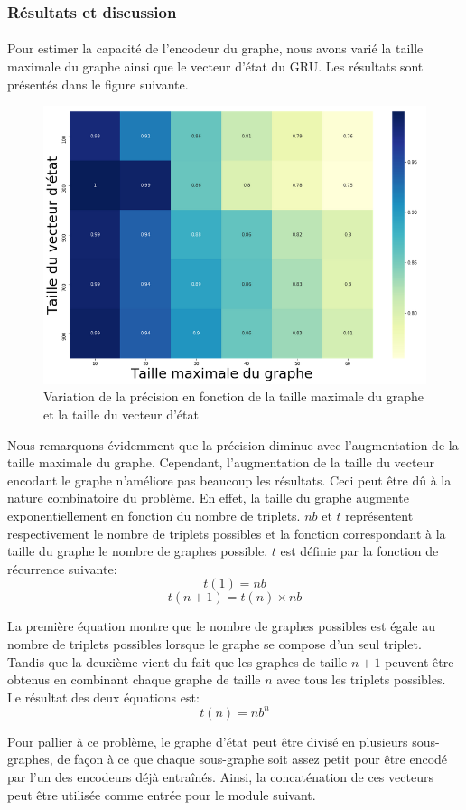 \subsubsection{Résultats et discussion}
\paragraph{}Pour estimer la capacité de l'encodeur du graphe, nous avons varié la taille maximale du graphe ainsi que le vecteur d'état du GRU. Les résultats sont présentés dans le figure suivante.
\begin{figure}[H] 
	\centering
	\includegraphics[width=0.95\linewidth]{images/Realisation/DM/heatmap.png}
	\caption{Variation de la précision en fonction de la taille maximale du graphe et la taille du vecteur d'état}\label{heatmap}
\end{figure}
\par Nous remarquons évidemment que la précision diminue avec l'augmentation de la taille maximale du graphe. Cependant, l'augmentation de la taille du vecteur encodant le graphe n'améliore pas beaucoup les résultats. Ceci peut être dû à la nature combinatoire du problème. En effet, la taille du graphe augmente exponentiellement en fonction du nombre de triplets. $nb$ et $t$ représentent respectivement le nombre de triplets possibles et la fonction correspondant à la taille du graphe le nombre de graphes possible. $t$ est définie par la fonction de récurrence suivante:
\[t(1) = nb\]
\[t(n+1) = t(n) \times nb\]
\par La première équation montre que le nombre de graphes possibles est égale au nombre de triplets possibles lorsque le graphe se compose d'un seul triplet. Tandis que la deuxième vient du fait que les graphes de taille $n+1$ peuvent être obtenus en combinant chaque graphe de taille $n$ avec tous les triplets possibles. Le résultat des deux équations est:
\[t(n) = nb^n\]
\par Pour pallier à ce problème, le graphe d'état peut être divisé en plusieurs sous-graphes, de façon à ce que chaque sous-graphe soit assez petit pour être encodé par l'un des encodeurs déjà entraînés. Ainsi, la concaténation de ces vecteurs peut être utilisée comme entrée pour le module suivant.
